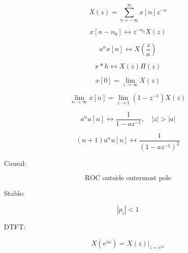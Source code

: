 \begin{tcolorbox}[title=One-Minute Revision,colback=blue!5]

\[
X(z)=
\sum_{n=-\infty}^{\infty}x[n]z^{-n}
\]

\[
x[n-n_0]\leftrightarrow z^{-n_0}X(z)
\]

\[
a^n x[n]\leftrightarrow X\left(\frac{z}{a}\right)
\]

\[
x*h\leftrightarrow X(z)H(z)
\]

\[
x[0]=\lim_{z\to\infty}X(z)
\]

\[
\lim_{n\to\infty}x[n]
=
\lim_{z\to1}(1-z^{-1})X(z)
\]

\[
a^n u[n]\leftrightarrow
\frac{1}{1-az^{-1}},
\quad |z|>|a|
\]

\[
(n+1)a^n u[n]
\leftrightarrow
\frac{1}{(1-az^{-1})^2}
\]

Causal:

\[
\text{ROC outside outermost pole}
\]

Stable:

\[
|p_i|<1
\]

DTFT:

\[
X(e^{j\omega})=X(z)|_{z=e^{j\omega}}
\]

\end{tcolorbox}
